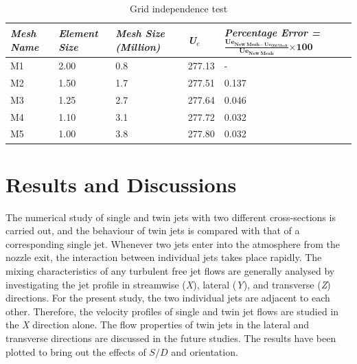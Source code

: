 \documentclass[Afour,sagev,times]{sagej}
\begin{document}
\begin{table}[ht]
	\caption{Grid independence test}
	\begin{centering}
	\begin{tabular}{|p{0.7in}|p{0.7in}|p{1.1in}|p{0.4in}|p{2.0in}|} \hline 
		\textbf{\textit{Mesh Name}} & \textbf{\textit{Element Size}} & \textbf{\textit{Mesh Size (Million)}} & \textbf{\textit{ U${}_{e}$}} & \textbf{\textit{Percentage Error = }}$\frac{{\boldsymbol{Ue}}_{\boldsymbol{New}\boldsymbol{\ }\boldsymbol{Mesh}\boldsymbol{-}\boldsymbol{\ }{\boldsymbol{Ue}}_{\boldsymbol{Old}\boldsymbol{\ }\boldsymbol{Mesh}}}}{{\boldsymbol{Ue}}_{\boldsymbol{New}\boldsymbol{\ }\boldsymbol{Mesh}}}\boldsymbol{\times }\boldsymbol{100}$\textbf{\textit{}} \\ \hline 
		M1 & 2.00 & 0.8 & 277.13 & - \\ \hline 
		M2 & 1.50 & 1.7 & 277.51 & 0.137 \\ \hline 
		M3 & 1.25 & 2.7 & 277.64 & 0.046 \\ \hline 
		M4 & 1.10 & 3.1 & 277.72 & 0.032 \\ \hline 
		M5 & 1.00 & 3.8 & 277.80 & 0.032 \\ \hline 
	\end{tabular}
	\par\end{centering}
\end{table}


\section{Results and Discussions}
The numerical study of single and twin jets with two different cross-sections is carried out, and the behaviour of twin jets is compared with that of a corresponding single jet. Whenever two jets enter into the atmosphere from the nozzle exit, the interaction between individual jets takes place rapidly. The mixing characteristics of any turbulent free jet flows are generally analysed by investigating the jet profile in streamwise (\textit{X}), lateral (\textit{Y}), and transverse (\textit{Z}) directions. For the present study, the two individual jets are adjacent to each other. Therefore, the velocity profiles of single and twin jet flows are studied in the \textit{X} direction alone. The flow properties of twin jets in the lateral and transverse directions are discussed in the future studies. The results have been plotted to bring out the effects of $S/D$ and orientation.  
\end{document}

